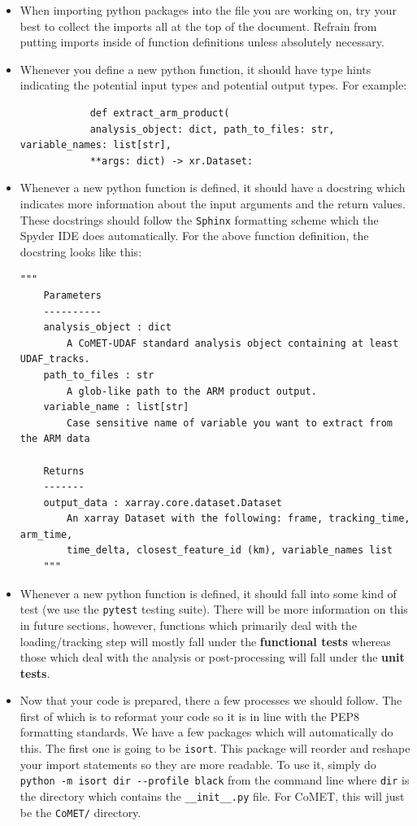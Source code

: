 \documentclass[10pt,a4paper]{article}
\begin{document}
	\begin{itemize}
		\item When importing python packages into the file you are working on, try your best to collect the imports all at the top of the document. Refrain from putting imports inside of function definitions unless absolutely necessary. 
		\item Whenever you define a new python function, it should have type hints indicating the potential input types and potential output types. For example: 
		
		\begin{verbatim}
			def extract_arm_product(
			analysis_object: dict, path_to_files: str, variable_names: list[str], 
			**args: dict) -> xr.Dataset:
		\end{verbatim}

		\item Whenever a new python function is defined, it should have a docstring which indicates more information about the input arguments and the return values. These docstrings should follow the \verb|Sphinx| formatting scheme which the Spyder \ac{IDE} does automatically. For the above function definition, the docstring looks like this:
		
		\begin{Verbatim}[tabsize=3]
	"""
	Parameters
	----------
	analysis_object : dict
		A CoMET-UDAF standard analysis object containing at least UDAF_tracks.
	path_to_files : str
		A glob-like path to the ARM product output.
	variable_name : list[str]
		Case sensitive name of variable you want to extract from the ARM data
				
	Returns
	-------
	output_data : xarray.core.dataset.Dataset
		An xarray Dataset with the following: frame, tracking_time, arm_time, 
		time_delta, closest_feature_id (km), variable_names list
	"""
		\end{Verbatim}
		
		\item Whenever a new python function is defined, it should fall into some kind of test (we use the \verb|pytest| testing suite). There will be more information on this in future sections, however, functions which primarily deal with the loading/tracking step will mostly fall under the \textbf{functional tests} whereas those which deal with the analysis or post-processing will fall under the \textbf{unit tests}.
		
		\item Now that your code is prepared, there a few processes we should follow. The first of which is to reformat your code so it is in line with the PEP8 formatting standards. We have a few packages which will automatically do this. The first one is going to be \verb|isort|. This package will reorder and reshape your import statements so they are more readable. To use it, simply do \verb|python -m isort dir --profile black| from the command line where \verb|dir| is the directory which contains the \verb|__init__.py| file. For \ac{CoMET}, this will just be the \verb|CoMET/| directory.
		

\end{itemize}
\end{document}
